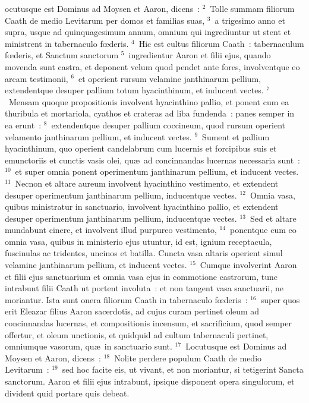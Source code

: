 \bchapter
{}ocutusque est Dominus ad Moysen et Aaron, dicens~:
${}^{2}$~Tolle summam filiorum Caath de medio Levitarum per domos et familias suas,
${}^{3}$~a trigesimo anno et supra, usque ad quinquagesimum annum, omnium qui ingrediuntur ut stent et ministrent in tabernaculo fœderis.
${}^{4}$~Hic est cultus filiorum Caath~: tabernaculum fœderis, et Sanctum sanctorum
${}^{5}$~ingredientur Aaron et filii ejus, quando movenda sunt castra, et deponent velum quod pendet ante fores, involventque eo arcam testimonii,
${}^{6}$~et operient rursum velamine janthinarum pellium, extendentque desuper pallium totum hyacinthinum, et inducent vectes.
${}^{7}$~Mensam quoque propositionis involvent hyacinthino pallio, et ponent cum ea thuribula et mortariola, cyathos et crateras ad liba fundenda~: panes semper in ea erunt~:
${}^{8}$~extendentque desuper pallium coccineum, quod rursum operient velamento janthinarum pellium, et inducent vectes.
${}^{9}$~Sument et pallium hyacinthinum, quo operient candelabrum cum lucernis et forcipibus suis et emunctoriis et cunctis vasis olei, qu\ae\ ad concinnandas lucernas necessaria sunt~:
${}^{10}$~et super omnia ponent operimentum janthinarum pellium, et inducent vectes.
${}^{11}$~Necnon et altare aureum involvent hyacinthino vestimento, et extendent desuper operimentum janthinarum pellium, inducentque vectes.
${}^{12}$~Omnia vasa, quibus ministratur in sanctuario, involvent hyacinthino pallio, et extendent desuper operimentum janthinarum pellium, inducentque vectes.
${}^{13}$~Sed et altare mundabunt cinere, et involvent illud purpureo vestimento,
${}^{14}$~ponentque cum eo omnia vasa, quibus in ministerio ejus utuntur, id est, ignium receptacula, fuscinulas ac tridentes, uncinos et batilla. Cuncta vasa altaris operient simul velamine janthinarum pellium, et inducent vectes.
${}^{15}$~Cumque involverint Aaron et filii ejus sanctuarium et omnia vasa ejus in commotione castrorum, tunc intrabunt filii Caath ut portent involuta~: et non tangent vasa sanctuarii, ne moriantur. Ista sunt onera filiorum Caath in tabernaculo fœderis~:
${}^{16}$~super quos erit Eleazar filius Aaron sacerdotis, ad cujus curam pertinet oleum ad concinnandas lucernas, et compositionis incensum, et sacrificium, quod semper offertur, et oleum unctionis, et quidquid ad cultum tabernaculi pertinet, omniumque vasorum, qu\ae\ in sanctuario sunt.
${}^{17}$~Locutusque est Dominus ad Moysen et Aaron, dicens~:
${}^{18}$~Nolite perdere populum Caath de medio Levitarum~:
${}^{19}$~sed hoc facite eis, ut vivant, et non moriantur, si tetigerint Sancta sanctorum. Aaron et filii ejus intrabunt, ipsique disponent opera singulorum, et divident quid portare quis debeat.
